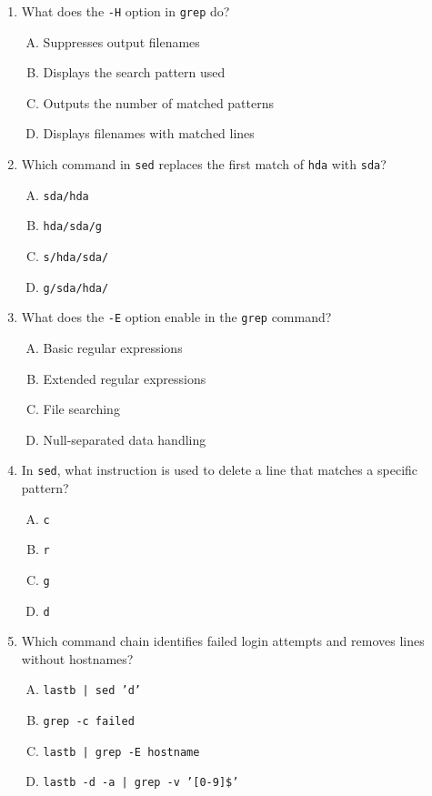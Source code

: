 \documentclass[a4paper]{report}
\begin{document}
\begin{enumerate}[1.]
    \item What does the \texttt{-H} option in \texttt{grep} do?  
    \begin{enumerate}[A)]
        \item Suppresses output filenames  
        \item Displays the search pattern used  
        \item Outputs the number of matched patterns  
        \item Displays filenames with matched lines  
    \end{enumerate}

    \item Which command in \texttt{sed} replaces the first match of \texttt{hda} with \texttt{sda}?  
    \begin{enumerate}[A)]
        \item \texttt{sda/hda}  
        \item \texttt{hda/sda/g}  
        \item \texttt{s/hda/sda/}  
        \item \texttt{g/sda/hda/}  
    \end{enumerate}

    \item What does the \texttt{-E} option enable in the \texttt{grep} command?  
    \begin{enumerate}[A)]
        \item Basic regular expressions  
        \item Extended regular expressions  
        \item File searching  
        \item Null-separated data handling  
    \end{enumerate}

    \item In \texttt{sed}, what instruction is used to delete a line that matches a specific pattern?  
    \begin{enumerate}[A)]
        \item \texttt{c}  
        \item \texttt{r}  
        \item \texttt{g}  
        \item \texttt{d}  
    \end{enumerate}

    \item Which command chain identifies failed login attempts and removes lines without hostnames?  
    \begin{enumerate}[A)]
        \item \texttt{lastb | sed 'd'}  
        \item \texttt{grep -c failed}  
        \item \texttt{lastb | grep -E hostname}  
        \item \texttt{lastb -d -a | grep -v '[0-9]\$'}  
    \end{enumerate}


\end{enumerate}
\end{document}
